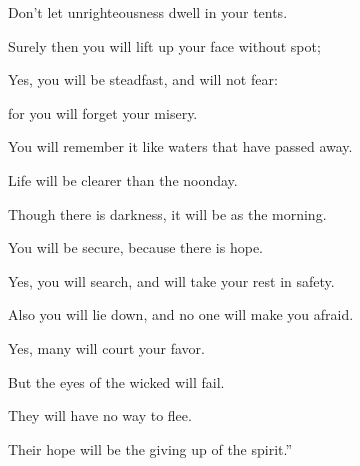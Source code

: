 {\par }{\QB Don’t let unrighteousness dwell in your tents.
\par }{\Q {}Surely then you will lift up your face without spot;
\par }{\QB Yes, you will be steadfast, and will not fear:
\par }{\Q {}for you will forget your misery.
\par }{\QB You will remember it like waters that have passed away.
\par }{\Q {}Life will be clearer than the noonday.
\par }{\QB Though there is darkness, it will be as the morning.
\par }{\Q {}You will be secure, because there is hope.
\par }{\QB Yes, you will search, and will take your rest in safety.
\par }{\Q {}Also you will lie down, and no one will make you afraid.
\par }{\QB Yes, many will court your favor.
\par }{\Q {}But the eyes of the wicked will fail.
\par }{\QB They will have no way to flee.
\par }{\QB Their hope will be the giving up of the spirit.”

}
